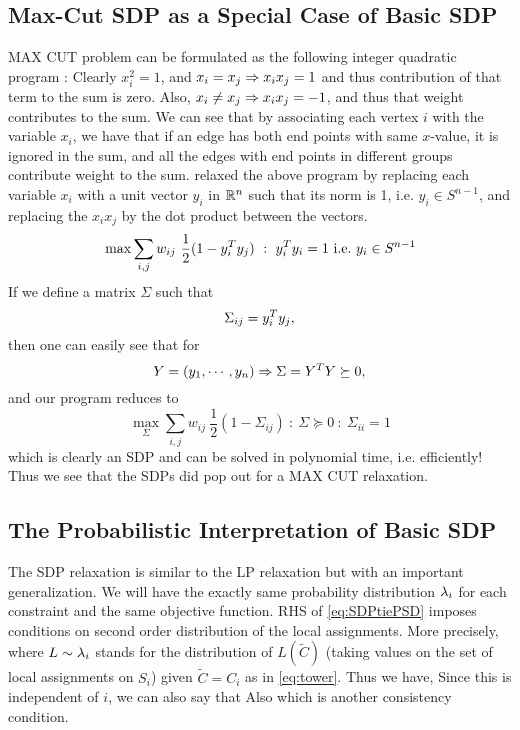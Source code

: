 \subsection{Max-Cut SDP as a Special Case of Basic SDP}\label{maxcut}
MAX CUT problem can be formulated as the following integer quadratic program : 
Clearly $x_i^2=1$, and $x_i=x_j\Rightarrow x_ix_j=1$ and thus contribution of that term to the sum is zero. 
Also, $x_i \neq x_j \Rightarrow x_ix_j=-1$, and thus that weight contributes to the sum. 
We can see that by associating each vertex $i$ with the variable $x_i$, we have that if an edge has both end points with same $x$-value, it is ignored in the sum, and all the edges with end points in different groups contribute weight to the sum. 
\cite{delormecombinatorial} relaxed the above program by replacing each variable $x_i$ with a unit vector $y_i$ in $\mathbb{R}^n$ such that its norm is 1, i.e. $y_i \in S^{n-1}$, and replacing the $x_ix_j$ by the dot product between the vectors. 
\[ \max \sum_{i,j} w_{ij} \ \frac{1}{2}(1-y_i^T y_j) ~:~ y_i^T y_i = 1 {\mbox {\ i.e.\ }} y_i \in S^{n-1} \]
If we define a matrix $\Sigma$ such that $$\Sigma_{ij} = y_i^T y_j,$$ then one can easily see that for $$Y = (y_1, \cdots, y_n) \Rightarrow \Sigma = Y^T Y \succeq 0,$$ and our program reduces to 
\[ \max_\Sigma \sum_{i,j} w_{ij} \ \frac{1}{2}(1-\Sigma_{ij}) ~:~ \Sigma \succeq 0 ~:~ \Sigma_{ii} = 1  \]
which is clearly an SDP and can be solved in polynomial time, i.e. efficiently! 
Thus we see that the SDPs did pop out for a MAX CUT relaxation.

\subsection{The Probabilistic Interpretation of Basic SDP}

The SDP relaxation is similar to the LP relaxation but with an important generalization. 
We will have the exactly same probability distribution $\lambda_{i}$ for each constraint and the same objective function. 
RHS of \ref{eq:SDPtiePSD} imposes conditions on second order distribution of the local assignments. 
More precisely,
 where $L \sim\lambda_i$ stands for the distribution of $L(\tilde{C})$ (taking values on the set of local assignments on $S_i$) given $\tilde{C} = C_i$ as in \ref{eq:tower}.
Thus we have, 
Since this is independent of $i$, we can also say that 
Also 
which is another consistency condition.


